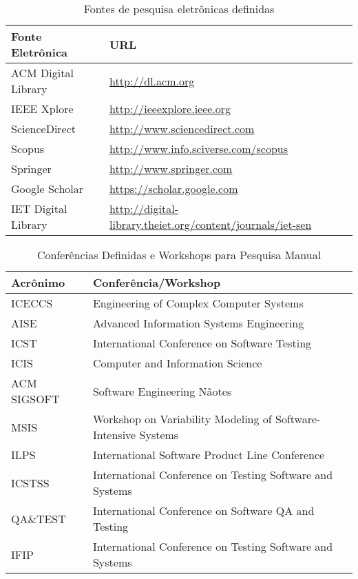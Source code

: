 \begin{table}[!h]
	\centering
	\scriptsize
	\caption{Fontes de pesquisa eletrônicas definidas}
	\label{table:fontes}
	\begin{tabular}{l|l}
		\hline \hline
		\textbf{Fonte Eletrônica} & \textbf{URL}                               							\\\hline
		ACM Digital Library  & \url{http://dl.acm.org}                                         \\\hline
		IEEE Xplore          & \url{http://ieeexplore.ieee.org}                                \\\hline
		ScienceDirect        & \url{http://www.sciencedirect.com}                              \\\hline
		Scopus               & \url{http://www.info.sciverse.com/scopus}                       \\\hline
		Springer             & \url{http://www.springer.com}                                   \\\hline
		Google Scholar       & \url{https://scholar.google.com}                                 \\\hline
		IET  Digital Library & \url{http://digital-library.theiet.org/content/journals/iet-sen} \\\hline
		\hline
	\end{tabular}
\end{table}

\begin{table}[!h]
	\centering
	\scriptsize
	\caption{Conferências Definidas e Workshops para Pesquisa Manual}
	\label{table:conferences}
	\begin{tabular}{l|l}
		\hline \hline
		\textbf{Acrônimo} & \textbf{Conferência/Workshop}                                 \\\hline
		ICECCS         & Engineering of Complex Computer Systems                        \\\hline
		AISE           & Advanced Information Systems Engineering                       \\\hline
		ICST           & International Conference on Software Testing                   \\\hline
		ICIS           & Computer and Information Science                               \\\hline
		ACM SIGSOFT    & Software Engineering Nãotes                                     \\\hline
		MSIS           & Workshop on Variability Modeling of Software-Intensive Systems \\\hline
		ILPS           & International Software Product Line Conference                 \\\hline
		ICSTSS         & International Conference on Testing Software and Systems       \\\hline
		QA\&TEST       & International Conference on Software QA and Testing            \\\hline
		IFIP           & International Conference on Testing Software and Systems       \\\hline
		\hline
	\end{tabular}
\end{table}

